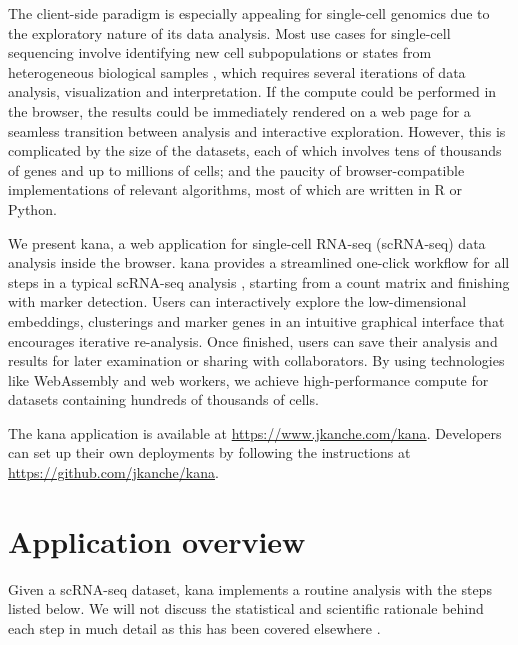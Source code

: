 \documentclass{article}
\begin{document}
The client-side paradigm is especially appealing for single-cell genomics due to the exploratory nature of its data analysis.
Most use cases for single-cell sequencing involve identifying new cell subpopulations or states from heterogeneous biological samples \cite{stegle2015computational},
which requires several iterations of data analysis, visualization and interpretation.
If the compute could be performed in the browser, the results could be immediately rendered on a web page for a seamless transition between analysis and interactive exploration.
However, this is complicated by the size of the datasets, each of which involves tens of thousands of genes and up to millions of cells;
and the paucity of browser-compatible implementations of relevant algorithms, most of which are written in R or Python.

We present kana, a web application for single-cell RNA-seq (scRNA-seq) data analysis inside the browser.
kana provides a streamlined one-click workflow for all steps in a typical scRNA-seq analysis \cite{amezquita2020orchestrating}, 
starting from a count matrix and finishing with marker detection.
Users can interactively explore the low-dimensional embeddings, clusterings and marker genes in an intuitive graphical interface that encourages iterative re-analysis.
Once finished, users can save their analysis and results for later examination or sharing with collaborators.
By using technologies like WebAssembly and web workers, we achieve high-performance compute for datasets containing hundreds of thousands of cells.

The kana application is available at \url{https://www.jkanche.com/kana}.
Developers can set up their own deployments by following the instructions at \url{https://github.com/jkanche/kana}.

\section{Application overview}

Given a scRNA-seq dataset, kana implements a routine analysis with the steps listed below.
We will not discuss the statistical and scientific rationale behind each step in much detail as this has been covered elsewhere \cite{oscabook}.
\end{document}
